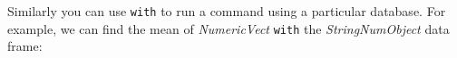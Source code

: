 Similarly you can use \texttt{with} to run a command using a particular database. For example, we can find the mean of \emph{NumericVect} \texttt{with} the \emph{StringNumObject} data frame:





























































